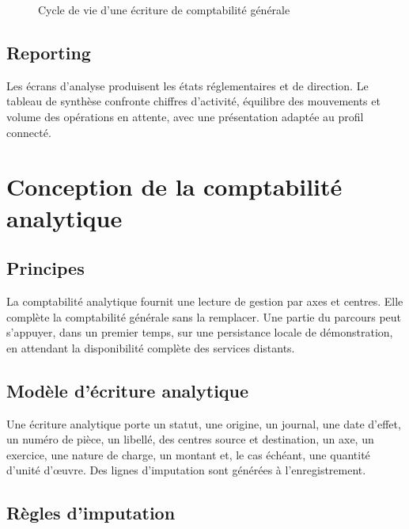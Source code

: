 \documentclass[12pt,a4paper]{report}
\begin{document}
\begin{figure}[htbp]
\centering
{}
\caption{Cycle de vie d'une écriture de comptabilité générale}
\label{fig:cg-cycle}
\end{figure}

\section{Reporting}

Les écrans d'analyse produisent les états réglementaires et de direction. Le tableau de synthèse confronte chiffres d'activité, équilibre des mouvements et volume des opérations en attente, avec une présentation adaptée au profil connecté.

\chapter{Conception de la comptabilité analytique}

\section{Principes}

La comptabilité analytique fournit une lecture de gestion par axes et centres. Elle complète la comptabilité générale sans la remplacer. Une partie du parcours peut s'appuyer, dans un premier temps, sur une persistance locale de démonstration, en attendant la disponibilité complète des services distants.

\section{Modèle d'écriture analytique}

Une écriture analytique porte un statut, une origine, un journal, une date d'effet, un numéro de pièce, un libellé, des centres source et destination, un axe, un exercice, une nature de charge, un montant et, le cas échéant, une quantité d'unité d'œuvre. Des lignes d'imputation sont générées à l'enregistrement.

\section{Règles d'imputation}
\end{document}
